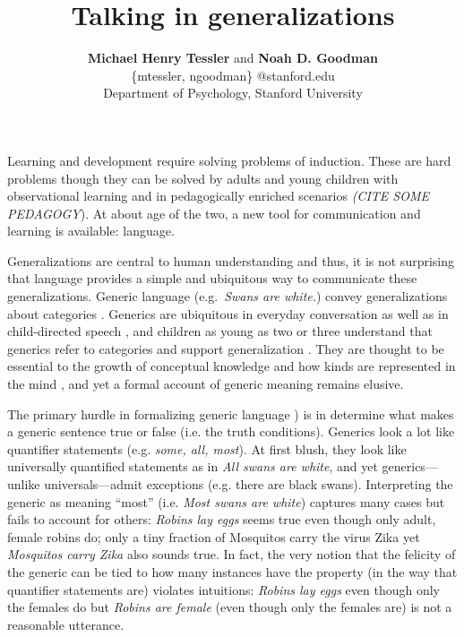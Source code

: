 \documentclass[11pt,letterpaper]{article}
\title{Talking in generalizations}
\author{{\large \bf Michael Henry Tessler} and {\large \bf Noah D. Goodman} \\
\{mtessler, ngoodman\} @stanford.edu\\
  Department of Psychology, Stanford University}
\begin{document}
\maketitle

Learning and development require solving problems of induction.
These are hard problems though they can be solved by adults and young children with observational learning \cite{Markman1989} 
and in pedagogically enriched scenarios \emph{(CITE SOME PEDAGOGY}).
At about age of the two, a new tool for communication and learning is available: language.

Generalizations are central to human understanding and thus, it is not surprising that language provides a simple and ubiquitous way to communicate these generalizations. 
Generic language (e.g.~\emph{Swans are white.}) convey generalizations about categories \cite{Carlson1977, Leslie2008}. 
Generics are ubiquitous in everyday conversation as well as in child-directed speech \cite{Gelman2008}, and children as young as two or three understand that generics refer to categories and support generalization \cite{Cimpian2008}.
They are thought to be essential to the growth of conceptual knowledge \cite{Gelman2004} and how kinds are represented in the mind \cite{Leslie2008}, and yet a formal account of generic meaning remains elusive. 

The primary hurdle in formalizing generic language ) is in determine what makes a generic sentence true or false (i.e. the truth conditions).
Generics look a lot like quantifier statements (e.g. \emph{some, all, most}).
At first blush, they look like universally quantified statements as in \emph{All swans are white}, and yet generics---unlike universals---admit exceptions (e.g. there are black swans). 
Interpreting the generic as meaning ``most'' (i.e. \emph{Most swans are white}) captures many cases but fails to account for others: \emph{Robins lay eggs} seems true even though only adult, female robins do; only a tiny fraction of Mosquitos carry the virus Zika yet \emph{Mosquitos carry Zika} also sounds true. 
In fact, the very notion that the felicity of the generic can be tied to how many instances have the property (in the way that quantifier statements are) violates intuitions: \emph{Robins lay eggs} even though only the females do but \emph{Robins are female} (even though only the females are) is not a reasonable utterance.

\end{document}
